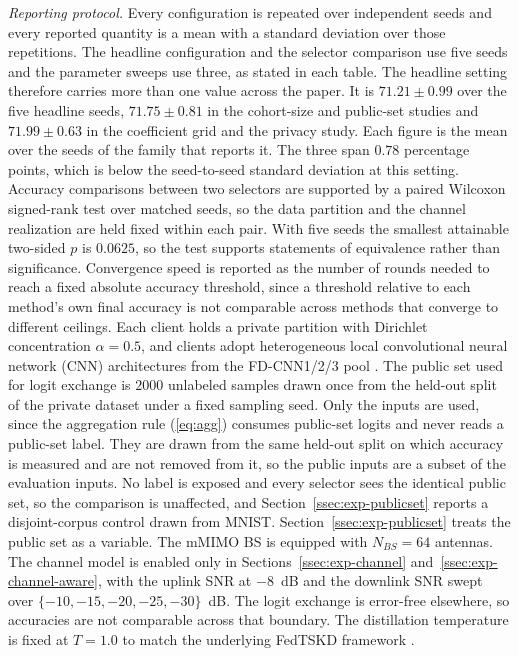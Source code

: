 \documentclass[journal]{IEEEtran}
\newcommand{\rev}[1]{#1}
\begin{document}
\rev{\textit{Reporting protocol.} Every configuration is repeated over independent seeds and every reported quantity is a mean with a standard deviation over those repetitions. The headline configuration and the selector comparison use five seeds and the parameter sweeps use three, as stated in each table. \rev{The headline setting therefore carries more than one value across the paper. It is $71.21 \pm 0.99$ over the five headline seeds, $71.75 \pm 0.81$ in the cohort-size and public-set studies and $71.99 \pm 0.63$ in the coefficient grid and the privacy study. Each figure is the mean over the seeds of the family that reports it. The three span $0.78$ percentage points, which is below the seed-to-seed standard deviation at this setting.} Accuracy comparisons between two selectors are supported by a paired Wilcoxon signed-rank test over matched seeds, so the data partition and the channel realization are held fixed within each pair. \rev{With five seeds the smallest attainable two-sided $p$ is $0.0625$, so the test supports statements of equivalence rather than significance.} Convergence speed is reported as the number of rounds needed to reach a fixed absolute accuracy threshold, since a threshold relative to each method's own final accuracy is not comparable across methods that converge to different ceilings.} Each client holds a private partition with Dirichlet concentration $\alpha = 0.5$, and clients adopt heterogeneous local convolutional neural network (CNN) architectures from the FD-CNN1/2/3 pool \cite{chan2021fedhe}. \rev{The public set used for logit exchange \cite{itahara2023distillation} is $2000$ unlabeled samples drawn once from the held-out split of the private dataset under a fixed sampling seed. Only the inputs are used, since the aggregation rule (\ref{eq:agg}) consumes public-set logits and never reads a public-set label. \rev{They are drawn from the same held-out split on which accuracy is measured and are not removed from it, so the public inputs are a subset of the evaluation inputs. No label is exposed and every selector sees the identical public set, so the comparison is unaffected, and Section~\ref{ssec:exp-publicset} reports a disjoint-corpus control drawn from MNIST.} Section~\ref{ssec:exp-publicset} treats the public set as a variable.} The mMIMO BS is equipped with $N_{BS} = 64$ antennas. \rev{The channel model is enabled only in Sections~\ref{ssec:exp-channel} and~\ref{ssec:exp-channel-aware}, with the uplink SNR at $-8$~dB and the downlink SNR swept over $\{-10,-15,-20,-25,-30\}$~dB. The logit exchange is error-free elsewhere, so accuracies are not comparable across that boundary.} The distillation temperature is fixed at $T = 1.0$ to match the underlying FedTSKD framework \cite{mu2024fedtskd}.
\end{document}
